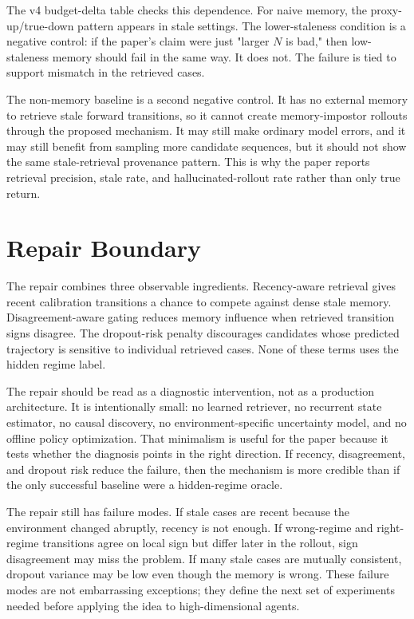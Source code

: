 \documentclass{article}
\begin{document}
The v4 budget-delta table checks this dependence. For naive memory, the
proxy-up/true-down pattern appears in \EvidenceHarmfulStaleLevels{} stale
settings. The lower-staleness condition is a negative control: if the paper's
claim were just "larger $N$ is bad," then low-staleness memory should fail in
the same way. It does not. The failure is tied to support mismatch in the
retrieved cases.

The non-memory baseline is a second negative control. It has no external
memory to retrieve stale forward transitions, so it cannot create
memory-impostor rollouts through the proposed mechanism. It may still make
ordinary model errors, and it may still benefit from sampling more candidate
sequences, but it should not show the same stale-retrieval provenance pattern.
This is why the paper reports retrieval precision, stale rate, and
hallucinated-rollout rate rather than only true return.

\section{Repair Boundary}
\label{app:repair-boundary}

The repair combines three observable ingredients. Recency-aware retrieval gives
recent calibration transitions a chance to compete against dense stale memory.
Disagreement-aware gating reduces memory influence when retrieved transition
signs disagree. The dropout-risk penalty discourages candidates whose predicted
trajectory is sensitive to individual retrieved cases. None of these terms
uses the hidden regime label.

The repair should be read as a diagnostic intervention, not as a production
architecture. It is intentionally small: no learned retriever, no recurrent
state estimator, no causal discovery, no environment-specific uncertainty
model, and no offline policy optimization. That minimalism is useful for the
paper because it tests whether the diagnosis points in the right direction. If
recency, disagreement, and dropout risk reduce the failure, then the mechanism
is more credible than if the only successful baseline were a hidden-regime
oracle.

The repair still has failure modes. If stale cases are recent because the
environment changed abruptly, recency is not enough. If wrong-regime and
right-regime transitions agree on local sign but differ later in the rollout,
sign disagreement may miss the problem. If many stale cases are mutually
consistent, dropout variance may be low even though the memory is wrong. These
failure modes are not embarrassing exceptions; they define the next set of
experiments needed before applying the idea to high-dimensional agents.
\end{document}
